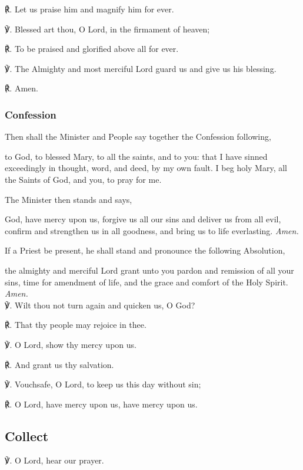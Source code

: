 \begin{multicols}{2}
℟. Let us praise him and magnify him for ever.

℣. Blessed art thou, O Lord, in the firmament of heaven;

℟. To be praised and glorified above all for ever.

℣. The Almighty and most merciful Lord guard us and give us his blessing.

℟. Amen.

\subsubsection{Confession}
\begin{rubric}
	Then shall the Minister and People say together the Confession following,
\end{rubric}
 to God, to blessed Mary, to all the saints, and to you: that I have sinned exceedingly in thought, word, and deed, by my own fault. I beg holy Mary, all the Saints of God, and you, to pray for me.

\begin{rubric}
	The Minister then stands and says,
\end{rubric}
 God, have mercy upon us, forgive us all our sins and deliver us from all evil, confirm and strengthen us in all goodness, and bring us to life everlasting. \textit{Amen.}

\begin{rubric}
	If a Priest be present, he shall stand and pronounce the following Absolution,
\end{rubric}

 the almighty and merciful Lord grant unto you pardon {} and remission of all your sins, time for amendment of life, and the grace and comfort of the Holy Spirit. \textit{Amen.}\\

℣. Wilt thou not turn again and quicken us, O God?

℟. That thy people may rejoice in thee.

℣. O Lord, show thy mercy upon us.

℟. And grant us thy salvation.

℣. Vouchsafe, O Lord, to keep us this day without sin;

℟. O Lord, have mercy upon us, have mercy upon us.

\subsection{Collect}
℣. O Lord, hear our prayer.


\end{multicols}
